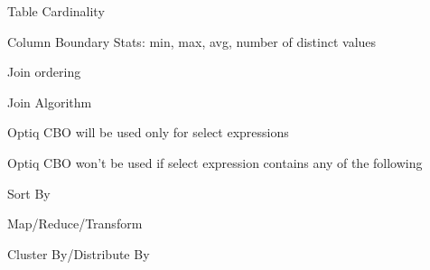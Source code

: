 \documentclass{vldb}
\newcommand{\ii}{\item}
\begin{document}
\ii Table Cardinality
\ii Column Boundary Stats: min, max, avg, number of distinct values
\ii Join ordering
\ii Join Algorithm
\ii Optiq CBO will be used only for select expressions
\ii Optiq CBO won’t be used if select expression contains any of the following
\ii Sort By
\ii Map/Reduce/Transform
\ii Cluster By/Distribute By
\end{document}
